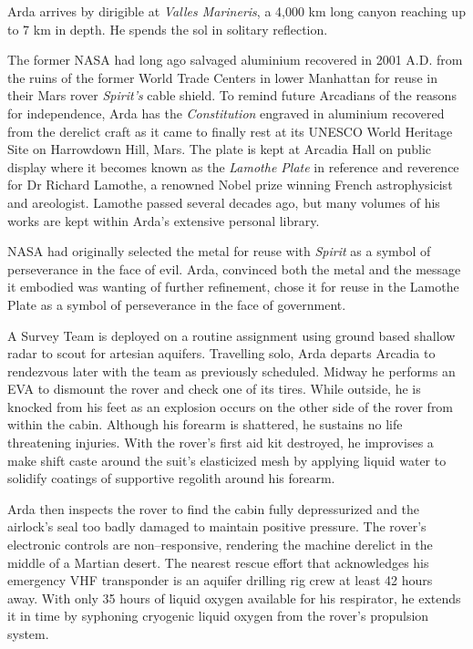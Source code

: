 Arda arrives by dirigible at {\it Valles Marineris}, a 4,000 km long canyon reaching up to 7 km in depth. He spends the sol in solitary reflection.

The former NASA had long ago salvaged aluminium recovered in 2001 A.D. from the ruins of the former World Trade Centers in lower Manhattan for reuse in their Mars rover {\it Spirit's} cable shield. To remind future Arcadians of the reasons for independence, Arda has the {\it Constitution} engraved in aluminium recovered from the derelict craft as it came to finally rest at its UNESCO World Heritage Site on Harrowdown Hill, Mars. The plate is kept at Arcadia Hall on public display where it becomes known as the {\it Lamothe Plate} in reference and reverence for Dr Richard Lamothe, a renowned Nobel prize winning French astrophysicist and areologist. Lamothe passed several decades ago, but many volumes of his works are kept within Arda's extensive personal library.

NASA had originally selected the metal for reuse with {\it Spirit} as a symbol of perseverance in the face of evil. Arda, convinced both the metal and the message it embodied was wanting of further refinement, chose it for reuse in the Lamothe Plate as a symbol of perseverance in the face of government.
\StopTimelineDate

A Survey Team is deployed on a routine assignment using ground based shallow radar to scout for artesian aquifers. Travelling solo, Arda departs Arcadia to rendezvous later with the team as previously scheduled. Midway he performs an EVA to dismount the rover and check one of its tires. While outside, he is knocked from his feet as an explosion occurs on the other side of the rover from within the cabin. Although his forearm is shattered, he sustains no life threatening injuries. With the rover's first aid kit destroyed, he improvises a make shift caste around the suit's elasticized mesh by applying liquid water to solidify coatings of supportive regolith around his forearm.

Arda then inspects the rover to find the cabin fully depressurized and the airlock's seal too badly damaged to maintain positive pressure. The rover's electronic controls are non--responsive, rendering the machine derelict in the middle of a Martian desert. The nearest rescue effort that acknowledges his emergency VHF transponder is an aquifer drilling rig crew at least 42 hours away. With only 35 hours of liquid oxygen available for his respirator, he extends it in time by syphoning cryogenic liquid oxygen from the rover's propulsion system.

